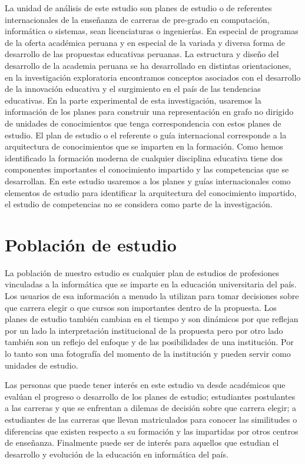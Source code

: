 La unidad de análisis de este estudio son planes de estudio o de referentes internacionales de la enseñanza de carreras de pre-grado en computación, informática o sistemas, sean licenciaturas o ingenierías. En especial de programas de la oferta académica peruana y en especial de la variada y diversa forma de desarrollo de las propuestas educativas peruanas. La estructura y diseño del desarrollo de la academia peruana se ha desarrollado en distintas orientaciones, en la investigación exploratoria encontramos conceptos asociados con el desarrollo de la innovación educativa y el surgimiento en el país de las tendencias educativas. En la parte experimental de esta investigación, usaremos la información de los planes para construir una representación en grafo no dirigido de unidades de conocimientos que tenga correspondencia con estos planes de estudio. El plan de estudio o el referente o guía internacional corresponde a la arquitectura de conocimientos que se imparten en la formación. Como hemos identificado la formación moderna de cualquier disciplina educativa tiene dos componentes importantes el conocimiento impartido y las competencias que se desarrollan. En este estudio usaremos a los planes y guías internacionales como elementos de estudio para identificar la arquitectura del conocimiento impartido, el estudio de competencias no se considera como parte de la investigación. 


\section{Población de estudio}

La población de nuestro estudio es cualquier plan de estudios de profesiones vinculadas a la informática que se imparte en la educación universitaria del país. Los usuarios de esa información a menudo la utilizan para tomar decisiones sobre que carrera elegir o que cursos son importantes dentro de la propuesta. Los planes de estudio también cambian en el tiempo y son dinámicos por que reflejan por un lado la interpretación institucional de la propuesta pero por otro lado también son un reflejo del enfoque y de las posibilidades de una institución. Por lo tanto son una fotografía del momento de la institución y pueden servir como unidades de estudio. 

Las personas que puede tener interés en este estudio va desde académicos que evalúan el progreso o desarrollo de los planes de estudio; estudiantes postulantes a las carreras y que se enfrentan a dilemas de decisión sobre que carrera elegir; a estudiantes de las carreras que llevan matriculados para conocer las similitudes o diferencias que existen respecto a su formación y las impartidas por otros centros de enseñanza. Finalmente puede ser de interés para aquellos que estudian el desarrollo y evolución de la educación en informática del país. 


